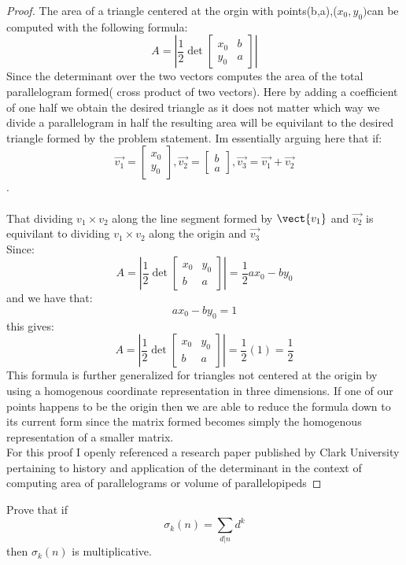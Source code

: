 \documentclass[11pt]{article}
\theoremstyle{definition}  %
\newcommand{\block}[2]{\begin{tcolorbox}[title={#1}]{#2}\end{tcolorbox}}
\begin{document}
\begin{proof}
The area of a triangle centered at the orgin with points(b,a),($x_0,y_0)$can be computed with the following formula:
\[
A=  \left|\frac{1}{2}\det\begin{bmatrix}
    x_0&b\\y_0&a
  \end{bmatrix}\right|
\]
Since the determinant over the two vectors computes the area of the total parallelogram formed( cross product of two vectors). Here by adding a coefficient of one half we obtain the desired triangle as it does not matter which way we divide a parallelogram in half the resulting area will be equivilant to the desired triangle formed by the problem statement. Im essentially arguing here that if:
\[
  \vec{v_1}=\begin{bmatrix}
    x_0\\y_0
\end{bmatrix},
\vec{v_2}=\begin{bmatrix}
  b\\a
\end{bmatrix},
\vec{v_3}=\vec{v_1}+\vec{v_2}
\].\\\\
That dividing $v_1\times v_2$ along the line segment formed by $\vect{v_1}$ and $\vec{v_2}$ is equivilant to dividing $v_1\times v_2$ along the origin and $\vec{v_3}$\\
Since:
\[
  A=\left|\frac{1}{2}\det\begin{bmatrix}
    x_0&y_0\\b&a
  \end{bmatrix}\right|=\frac{1}{2}ax_0-by_0
\]
and we have that:
\[
  ax_0-by_0=1
\]
this gives:
\[
A=  \left|\frac{1}{2}\det\begin{bmatrix}
    x_0&y_0\\b&a
  \end{bmatrix}\right|=\frac{1}{2}(1)=\frac{1}{2}
\]
This formula is further generalized for triangles not centered at the origin by using a homogenous coordinate representation in three dimensions. If one of our points happens to be the origin then we are able to reduce the formula down to its current form since the matrix formed becomes simply the homogenous representation of a smaller matrix.\\
For this proof I openly referenced a research paper published by Clark University pertaining to history and application of the determinant in the context of computing area of parallelograms or volume of parallelopipeds

\end{proof}
\block{Question 6.4.1}{ Prove that if $$\sigma_k(n)=\sum_{d|n}d^k$$ then $\sigma_k(n)$ is multiplicative. }
\end{document}
